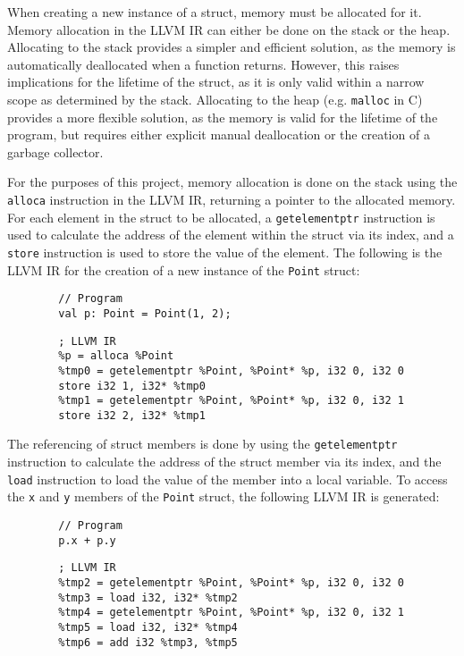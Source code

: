 When creating a new instance of a struct, memory must be allocated for it. Memory allocation in the
LLVM IR can either be done on the stack or the heap. Allocating to the stack provides a simpler and
efficient solution, as the memory is automatically deallocated when a function returns. However,
this raises implications for the lifetime of the struct, as it is only valid within a narrow scope
as determined by the stack. Allocating to the heap (e.g. \texttt{malloc} in C) provides a more
flexible solution, as the memory is valid for the lifetime of the program, but requires either
explicit manual deallocation or the creation of a garbage collector.

For the purposes of this project, memory allocation is done on the stack using the \texttt{alloca}
instruction in the LLVM IR, returning a pointer to the allocated memory. For each element in the
struct to be allocated, a \texttt{getelementptr} instruction is used to calculate the address of the
element within the struct via its index, and a \texttt{store} instruction is used to store the value
of the element. The following is the LLVM IR for the creation of a new instance of the
\texttt{Point} struct:

\begin{tcolorbox}
    \begin{verbatim}
        // Program
        val p: Point = Point(1, 2);
    \end{verbatim}
    \tcblower
    \begin{verbatim}
        ; LLVM IR
        %p = alloca %Point
        %tmp0 = getelementptr %Point, %Point* %p, i32 0, i32 0
        store i32 1, i32* %tmp0
        %tmp1 = getelementptr %Point, %Point* %p, i32 0, i32 1
        store i32 2, i32* %tmp1
    \end{verbatim}
\end{tcolorbox}

The referencing of struct members is done by using the \texttt{getelementptr} instruction to
calculate the address of the struct member via its index, and the \texttt{load} instruction to load
the value of the member into a local variable. To access the \texttt{x} and \texttt{y} members of
the \texttt{Point} struct, the following LLVM IR is generated:

\begin{tcolorbox}
    \begin{verbatim}
        // Program
        p.x + p.y
    \end{verbatim}
    \tcblower
    \begin{verbatim}
        ; LLVM IR
        %tmp2 = getelementptr %Point, %Point* %p, i32 0, i32 0
        %tmp3 = load i32, i32* %tmp2
        %tmp4 = getelementptr %Point, %Point* %p, i32 0, i32 1
        %tmp5 = load i32, i32* %tmp4
        %tmp6 = add i32 %tmp3, %tmp5
    \end{verbatim}
\end{tcolorbox}

